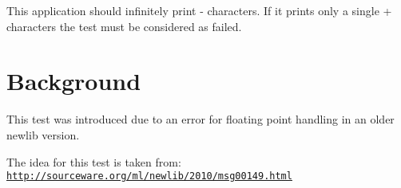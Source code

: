 This application should infinitely print \textquotesingle{}-\/\textquotesingle{} characters. If it prints only a single \textquotesingle{}+\textquotesingle{} characters the test must be considered as failed.

\section*{Background }

This test was introduced due to an error for floating point handling in an older newlib version.

The idea for this test is taken from\+: \href{http://sourceware.org/ml/newlib/2010/msg00149.html}{\tt http\+://sourceware.\+org/ml/newlib/2010/msg00149.\+html} 